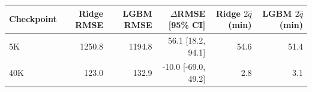\begin{tabular}{lrrrrr}
\hline
Checkpoint & Ridge RMSE & LGBM RMSE & $\Delta$RMSE [95\% CI] & Ridge $2\hat{q}$ (min) & LGBM $2\hat{q}$ (min) \\
\hline
5K & 1250.8 & 1194.8 & 56.1 [18.2, 94.1] & 54.6 & 51.4 \\
40K & 123.0 & 132.9 & -10.0 [-69.0, 49.2] & 2.8 & 3.1 \\
\hline
\end{tabular}
